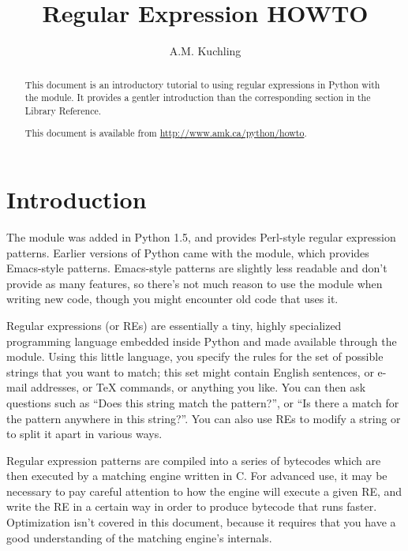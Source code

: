 \documentclass{howto}
\title{Regular Expression HOWTO}
\author{A.M. Kuchling}
\begin{document}
\maketitle

\begin{abstract}
\noindent
This document is an introductory tutorial to using regular expressions
in Python with the  module.  It provides a gentler
introduction than the corresponding section in the Library Reference.

This document is available from 
\url{http://www.amk.ca/python/howto}.

\end{abstract}

\tableofcontents

\section{Introduction}

The  module was added in Python 1.5, and provides
Perl-style regular expression patterns.  Earlier versions of Python
came with the  module, which provides Emacs-style
patterns.  Emacs-style patterns are slightly less readable and
don't provide as many features, so there's not much reason to use
the  module when writing new code, though you might
encounter old code that uses it.

Regular expressions (or REs) are essentially a tiny, highly
specialized programming language embedded inside Python and made
available through the  module.  Using this little language,
you specify the rules for the set of possible strings that you want to
match; this set might contain English sentences, or e-mail addresses,
or TeX commands, or anything you like.  You can then ask questions
such as ``Does this string match the pattern?'', or ``Is there a match
for the pattern anywhere in this string?''.  You can also use REs to
modify a string or to split it apart in various ways.

Regular expression patterns are compiled into a series of bytecodes
which are then executed by a matching engine written in C.  For
advanced use, it may be necessary to pay careful attention to how the
engine will execute a given RE, and write the RE in a certain way in
order to produce bytecode that runs faster.  Optimization isn't
covered in this document, because it requires that you have a good
understanding of the matching engine's internals.
\end{document}
